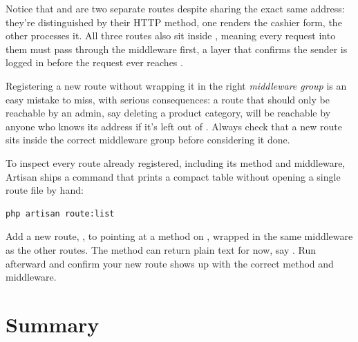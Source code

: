 Notice that  and  are two separate routes
despite sharing the exact same address: they're distinguished by their
HTTP method, one renders the cashier form, the other processes it. All
three routes also sit inside ,
meaning every request into them must pass through the  middleware
first, a layer that confirms the sender is logged in before the request
ever reaches .

\begin{warningbox}
Registering a new route without wrapping it in the right \textit{middleware
group} is an easy mistake to miss, with serious consequences: a route that
should only be reachable by an admin, say deleting a product category, will
be reachable by anyone who knows its address if it's left out of
. Always check that a new
route sits inside the correct middleware group before considering it done.
\end{warningbox}

To inspect every route already registered, including its method and
middleware, Artisan ships a command that prints a compact table without
opening a single route file by hand:

\begin{lstlisting}[language=bash]
php artisan route:list
\end{lstlisting}

\begin{challengebox}
Add a new route, , to 
pointing at a  method on ,
wrapped in the same  middleware as the other  routes.
The method can return plain text for now, say . Run  afterward and confirm your new route
shows up with the correct method and middleware.
\end{challengebox}


\section{Summary}
\label{sec:http-dan-mvc-rangkuman}

